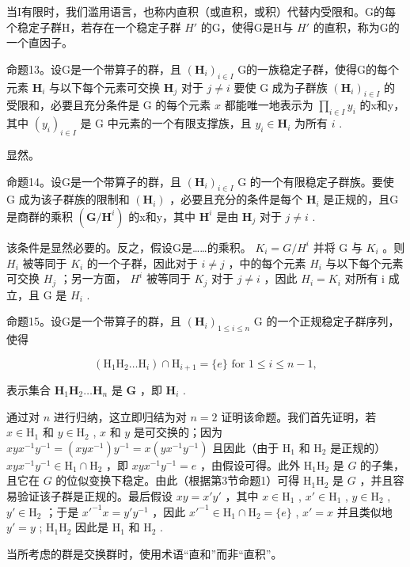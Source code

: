 当I有限时，我们滥用语言，也称内直积（或直积，或积）代替内受限和。G的每个稳定子群H，若存在一个稳定子群 \(H'\) 的G，使得G是H与 \(H'\) 的直积，称为G的一个直因子。

命题13。设G是一个带算子的群，且 \((\mathbf{H}_i)_{i\in I}\) G的一族稳定子群，使得G的每个元素 \(\mathbf{H}_i\) 与以下每个元素可交换 \(\mathbf{H}_j\) 对于 \(j\neq i\) 要使 G 成为子群族 \((\mathbf{H}_i)_{i\in I}\) 的受限和，必要且充分条件是 G 的每个元素 \(x\) 都能唯一地表示为 \(\prod_{i\in I}y_i\) 的x和y，其中 \((y_i)_{i\in I}\) 是 G 中元素的一个有限支撑族，且 \(y_i\in \mathbf{H}_i\) 为所有 \(i\) .

显然。

命题14。设G是一个带算子的群，且 \((\mathbf{H}_i)_{i\in I}\) G 的一个有限稳定子群族。要使 G 成为该子群族的限制和 \((\mathbf{H}_i)\) ，必要且充分的条件是每个 \(\mathbf{H}_i\) 是正规的，且G是商群的乘积 \((\mathbf{G} / \mathbf{H}^i)\) 的x和y，其中 \(\mathbf{H}^i\) 是由 \(\mathbf{H}_j\) 对于 \(j\neq i\) .

该条件是显然必要的。反之，假设G是……的乘积。 \(K_{i} = G/H^{i}\) 并将 G 与 \(K_{i}\) 。则 \(H_{i}\) 被等同于 \(K_{i}\) 的一个子群，因此对于 \(i \neq j\) ，中的每个元素 \(H_{i}\) 与以下每个元素可交换 \(H_{j}\) ；另一方面， \(H^{i}\) 被等同于 \(K_{j}\) 对于 \(j \neq i\) ，因此 \(H_{i} = K_{i}\) 对所有 i 成立，且 G 是 \(H_{i}\) .

命题15。设G是一个带算子的群，且 \((\mathbf{H}_i)_{1\leqslant i\leqslant n}\) G 的一个正规稳定子群序列，使得

\[
\left(\mathrm{H} _ {1} \mathrm{H} _ {2} \dots \mathrm{H} _ {i}\right) \cap \mathrm{H} _ {i + 1} = \{e \} \text { for } 1 \leqslant i \leqslant n - 1,
\]

表示集合 \(\mathbf{H}_1\mathbf{H}_2\ldots \mathbf{H}_n\) 是 \(\mathbf{G}\) ，即 \(\mathbf{H}_i\) .

通过对 \(n\) 进行归纳，这立即归结为对 \(n = 2\) 证明该命题。我们首先证明，若 \(x \in \mathrm{H}_1\) 和 \(y \in \mathrm{H}_2\) , \(x\) 和 \(y\) 是可交换的；因为 \(xyx^{-1}y^{-1} = (xyx^{-1})y^{-1} = x(yx^{-1}y^{-1})\) 且因此（由于 \(\mathrm{H}_1\) 和 \(\mathrm{H}_2\) 是正规的） \(xyx^{-1}y^{-1} \in \mathrm{H}_1 \cap \mathrm{H}_2\) ，即 \(xyx^{-1}y^{-1} = e\) ，由假设可得。此外 \(\mathrm{H}_1\mathrm{H}_2\) 是 \(G\) 的子集，且它在 \(G\) 的位似变换下稳定。由此（根据第3节命题1）可得 \(\mathrm{H}_1\mathrm{H}_2\) 是 \(G\) ，并且容易验证该子群是正规的。最后假设 \(xy = x'y'\) ，其中 \(x \in \mathrm{H}_1\) , \(x' \in \mathrm{H}_1\) , \(y \in \mathrm{H}_2\) , \(y' \in \mathrm{H}_2\) ；于是 \(x'^{-1}x = y'y^{-1}\) ，因此 \(x'^{-1} \in \mathrm{H}_1 \cap \mathrm{H}_2 = \{e\}\) , \(x' = x\) 并且类似地 \(y' = y\) ; \(\mathrm{H}_1\mathrm{H}_2\) 因此是 \(\mathrm{H}_1\) 和 \(\mathrm{H}_2\) .

当所考虑的群是交换群时，使用术语“直和”而非“直积”。

